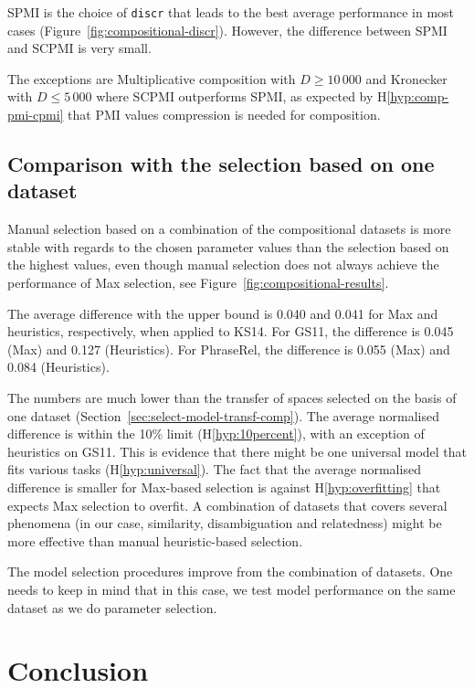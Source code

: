 

SPMI is the choice of \texttt{discr} that leads to the best average performance in most cases (Figure~\ref{fig:compositional-discr}). However, the difference between SPMI and SCPMI is very small.

The exceptions are Multiplicative composition with $D \geq 10\,000$ and Kronecker with $D \leq 5\,000$ where SCPMI outperforms SPMI, as expected by H\ref{hyp:comp-pmi-cpmi} that PMI values compression is needed for composition.

\subsection{Comparison with the selection based on one dataset}
\label{sec:comp-with-single-comp}

Manual selection based on a combination of the compositional datasets is more stable with regards to the chosen parameter values than the selection based on the highest values, even though manual selection does not always achieve the performance of Max selection, see Figure~\ref{fig:compositional-results}.

The average difference with the upper bound is 0.040 and 0.041 for Max and heuristics, respectively, when applied to KS14. For GS11, the difference is 0.045 (Max) and 0.127 (Heuristics). For PhraseRel, the difference is 0.055 (Max) and 0.084 (Heuristics).

The numbers are much lower than the transfer of spaces selected on the basis of one dataset (Section~\ref{sec:select-model-transf-comp}). The average normalised difference is within the 10\% limit (H\ref{hyp:10percent}), with an exception of heuristics on GS11. This is evidence that there might be one universal model that fits various tasks (H\ref{hyp:universal}). The fact that the average normalised difference is smaller for Max-based selection is against H\ref{hyp:overfitting} that expects Max selection to overfit. A combination of datasets that covers several phenomena (in our case, similarity, disambiguation and relatedness) might be more effective than manual heuristic-based selection.

The model selection procedures improve from the combination of datasets. One needs to keep in mind that in this case, we test model performance on the same dataset as we do parameter selection.

\section{Conclusion}
\label{sec:conclusion-comp}

